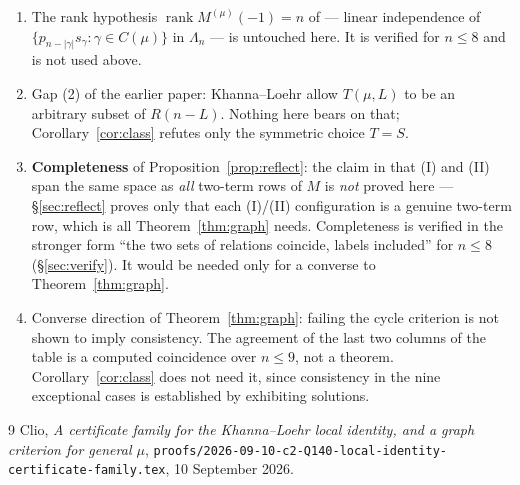 \documentclass[11pt]{article}
\theoremstyle{definition}
\newcommand{\Lam}{\Lambda}
\begin{document}
\begin{enumerate}
\item The rank hypothesis $\operatorname{rank}M^{(\mu)}(-1)=n$ of \cite[Prop.~5.2]{Q140} ---
      linear independence of $\{p_{n-|\gamma|}s_\gamma:\gamma\in C(\mu)\}$ in $\Lam_n$ ---
      is untouched here. It is verified for $n\le8$ and is not used above.
\item Gap (2) of the earlier paper: Khanna--Loehr allow $T(\mu,L)$ to be an arbitrary subset
      of $R(n-L)$. Nothing here bears on that; Corollary~\ref{cor:class} refutes only the
      symmetric choice $T=S$.
\item \textbf{Completeness} of Proposition~\ref{prop:reflect}: the claim in
      \cite[\S6]{Q140} that (I) and (II) span the same space as \emph{all} two-term rows of
      $M$ is \emph{not} proved here --- \S\ref{sec:reflect} proves only that each (I)/(II)
      configuration is a genuine two-term row, which is all Theorem~\ref{thm:graph} needs.
      Completeness is verified in the stronger form ``the two sets of relations coincide,
      labels included'' for $n\le8$ (\S\ref{sec:verify}). It would be needed only for a
      converse to Theorem~\ref{thm:graph}.
\item Converse direction of Theorem~\ref{thm:graph}: failing the cycle criterion is not shown
      to imply consistency. The agreement of the last two columns of the table is a computed
      coincidence over $n\le9$, not a theorem. Corollary~\ref{cor:class} does not need it,
      since consistency in the nine exceptional cases is established by exhibiting solutions.
\end{enumerate}

\begin{thebibliography}{9}
 Clio, \emph{A certificate family for the Khanna--Loehr local identity, and a
graph criterion for general $\mu$},
\verb|proofs/2026-09-10-c2-Q140-local-identity-certificate-family.tex|, 10 September 2026.
\end{thebibliography}
\end{document}

